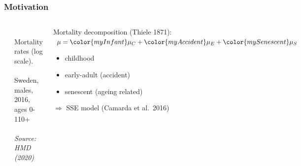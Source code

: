 \documentclass[12pt, xcolor=table]{beamer}  %
\begin{document}
\begin{frame}[noframenumbering]\frametitle{Motivation}
	\vspace{-0.05cm}
	
	\begin{columns}
		\begin{center}
			\includegraphics[scale=.27]{Figures/Ch3/F7_2}
		\end{center}
		
		\vspace{-0.15cm}
\tiny $\quad\quad\quad$ Mortality rates (log scale). \\
$\quad\quad\quad$ Sweden, males, 2016, ages 0-110+ \\ $\quad\quad\quad$ \textit{Source: HMD (2020)}
		
		
		\begin{center}
			Mortality decomposition {\scriptsize(Thiele 1871)}: $\mu = {\color{myInfant}\mu_C} + {\color{myAccident}\mu_E} + {\color{mySenescent}\mu_S}$
			\bigskip
			\begin{itemize}
				\item {\color{myInfant} childhood}
				\bigskip
				\item {\color{myAccident} early-adult (accident)}
				\bigskip
				\item {\color{mySenescent} senescent (ageing related)}
				\bigskip
			\end{itemize}
			\vspace{0.15cm}
			{\color{White} $\Rightarrow$ SSE model {\scriptsize (Camarda et al.~2016)}}
		\end{center}		
		
	\end{columns}
	
	
\end{frame}
\end{document}
